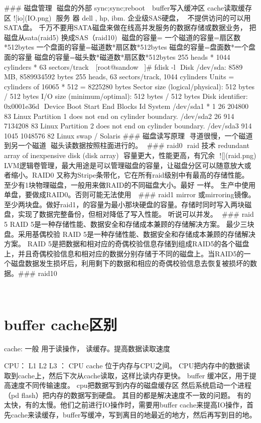 ### 磁盘管理
​
磁盘的外部
sync;sync;reboot
​
​
buffer写入缓冲区
cache读取缓存区
![io](IO.png)
​
服务 器 dell , hp, ibm.
企业级SAS硬盘，
​
​
不提供访问的可以用SATA盘。
​
千万不要用SATA磁盘来做在线高并发服务的数据存储或数据业务，
把磁盘从sata(raid5) 换成SAS（raid10)
​
磁盘的容量=
 一个磁道的容量=扇区数*512bytes
 一个盘面的容量=磁道数*扇区数*512bytes
 磁盘的容量=盘面数*一个盘面的容量
​
 磁盘的容量=磁头数*磁道数*扇区数*512bytes
          255 heads * 1044 cylinders * 63 sectors/track
​
​
[root@sandow ~]# fdisk -l
​
Disk /dev/sda: 8589 MB, 8589934592 bytes
255 heads, 63 sectors/track, 1044 cylinders
Units = cylinders of 16065 * 512 = 8225280 bytes
Sector size (logical/physical): 512 bytes / 512 bytes
I/O size (minimum/optimal): 512 bytes / 512 bytes
Disk identifier: 0x0001e36d
​
   Device Boot      Start         End      Blocks   Id  System
/dev/sda1   *           1          26      204800   83  Linux
Partition 1 does not end on cylinder boundary.
/dev/sda2              26         914     7134208   83  Linux
Partition 2 does not end on cylinder boundary.
/dev/sda3             914        1045     1048576   82  Linux swap / Solaris
​
### 磁盘读写原理
​
寻道很慢，一个磁道到另一个磁道
​
​
磁头读数据按照柱面进行的。
​
### raid0
​
raid 技术
redundant array of inexpensive disk  (disk array)
​
容量更大，性能更高，有冗余
​
![](raid.png)
​
​
​
LVM逻辑卷管理，最大用途是可以管理磁盘的容量，让磁盘分区可以随意放大或者缩小。
​
RAID0  又称为Stripe条带化，它在所有raid级别中有最高的存储性能。
至少有1块物理磁盘，一般用来做RAID的不同磁盘大小。最好 一样。
生产中使用单盘，要做成RAID0。否则可能无法使用
​
​
### raid1
mirror 或mirroring镜像。至少两块盘。做好raid1，的容量为最小那块硬盘的容量。存储时同时写入两块磁盘，实现了数据完整备份，但相对降低了写入性能。 听说可以并发。
​
### raid 5
RAID 5是一种存储性能、数据安全和存储成本兼顾的存储解决方案。
最少三块盘。采用基偶校验
RAID 5是一种存储性能、数据安全和存储成本兼顾的存储解决方案。
RAID 5是把数据和相对应的奇偶校验信息存储到组成RAID5的各个磁盘上，并且奇偶校验信息和相对应的数据分别存储于不同的磁盘上。当RAID5的一个磁盘数据发生损坏后，利用剩下的数据和相应的奇偶校验信息去恢复被损坏的数据。
​
### raid10

​

\section{buffer cache区别}
cache:  一般 用于读操作， 读缓存。提高数据读取速度

CPU： L1 L2 L3  ： CPU cache 位于内存与CPU之间。 CPU把内存中的数据读取到cache上，然后下次从cache读取，这样比读内存更快。
buffer 缓冲区，用于提高速度不同传输速度。 cpu把数据写到内存的磁盘缓存区 然后系统启动一个进程（pd flash）把内存的数据写到硬盘。
其目的都是解决速度不一致的问题。 有的太快，有的太慢。他们之前进行IO操作时，需要用buffer cache来提高IO操作，首先cache来读缓存，buffer写缓冲，写到离目的地最近的地方，然后再写到目的地。


